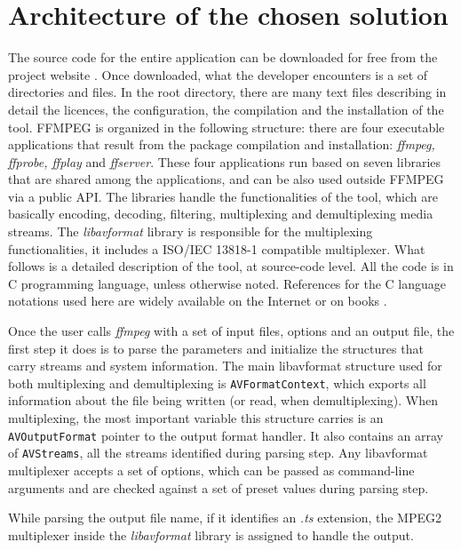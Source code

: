 \documentclass[
	12pt,				%
	openright,			%
	twoside,			%
	a4paper,			%
	brazil,
	french,				%
	english
	]{abntex2}
\begin{document}
\chapter{Architecture of the chosen solution}

The source code for the entire application can be downloaded for free from the project website \cite{ffmpeg}. Once downloaded, what the developer encounters is a set of directories and files. In the root directory, there are many text files describing in detail the licences, the configuration, the compilation and the installation of the tool. FFMPEG is organized in the following structure: there are four executable applications that result from the package compilation and installation: \textit{ffmpeg, ffprobe, ffplay} and \textit{ffserver}. These four applications run based on seven libraries that are shared among the applications, and can be also used outside FFMPEG via a public API. The libraries handle the functionalities of the tool, which are basically encoding, decoding, filtering, multiplexing and demultiplexing media streams. The \textit{libavformat} library is responsible for the multiplexing functionalities, it includes a ISO/IEC 13818-1 compatible multiplexer. What follows is a detailed description of the tool, at source-code level. All the code is in C programming language, unless otherwise noted. References for the C language notations used here are widely available on the Internet \cite{cpp_reference} or on books \cite{ritchie}.

Once the user calls \textit{ffmpeg} with a set of input files, options and an output file, the first step it does is to parse the parameters and initialize the structures that carry streams and system information. The main libavformat structure used for both multiplexing and demultiplexing is \texttt{AVFormatContext}, which exports all information about the file being written (or read, when demultiplexing). When multiplexing, the most important variable this structure carries is an \texttt{AVOutputFormat} pointer to the output format handler. It also contains an array of \texttt{AVStreams}, all the streams identified during parsing step. Any libavformat multiplexer accepts a set of options, which can be passed as command-line arguments and are checked against a set of preset values during parsing step.

While parsing the output file name, if it identifies an \textit{.ts} extension, the MPEG2 multiplexer inside the \textit{libavformat} library  is assigned to handle the output. 
\end{document}
